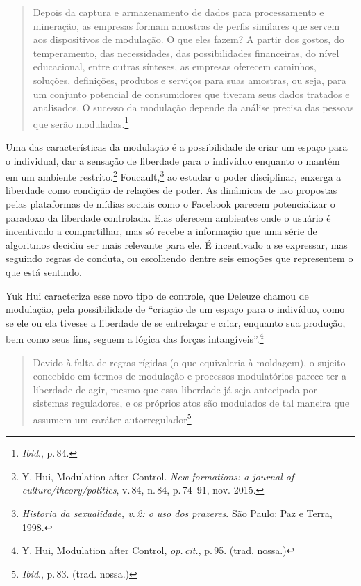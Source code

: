 \begin{quote}
Depois da captura e armazenamento de dados para processamento e
mineração, as empresas formam amostras de perfis similares que servem
aos dispositivos de modulação. O que eles fazem? A partir dos gostos, do
temperamento, das necessidades, das possibilidades financeiras, do nível
educacional, entre outras sínteses, as empresas oferecem caminhos,
soluções, definições, produtos e serviços para suas amostras, ou seja,
para um conjunto potencial de consumidores que tiveram seus dados
tratados e analisados. O sucesso da modulação depende da análise precisa
das pessoas que serão moduladas.\footnote{\textit{Ibid}., p.\,84.}
\end{quote}

Uma das características da modulação é a possibilidade de criar um
espaço para o individual, dar a sensação de liberdade para o indivíduo
enquanto o mantém em um ambiente restrito.\footnote{Y. Hui, Modulation after Control. \textit{New formations: a journal of culture/theory/politics}, v.\,84, n.\,84, p.\,74--91, nov. 2015.} Foucault,\footnote{\textit{Historia da sexualidade, v.\,2: o uso dos prazeres}. São Paulo: Paz e Terra, 1998.} ao estudar o poder disciplinar, enxerga a liberdade como condição de
relações de poder. As dinâmicas de uso propostas pelas plataformas de
mídias sociais como o Facebook parecem potencializar o paradoxo da
liberdade controlada. Elas oferecem ambientes onde o usuário é
incentivado a compartilhar, mas só recebe a informação que uma série de
algoritmos decidiu ser mais relevante para ele. É incentivado a se
expressar, mas seguindo regras de conduta, ou escolhendo dentre seis
emoções que representem o que está sentindo.

Yuk Hui caracteriza esse novo tipo de controle, que Deleuze
chamou de modulação, pela possibilidade de ``criação de um espaço
para o indivíduo, como se ele ou ela tivesse a liberdade de se
entrelaçar e criar, enquanto sua produção, bem como seus fins, seguem a
lógica das forças intangíveis''.\footnote{Y. Hui, Modulation after Control, \textit{op.\,cit.}, p.\,95. (trad. nossa.)}

\begin{quote}
Devido à falta de regras rígidas (o que equivaleria à moldagem), o
sujeito concebido em termos de modulação e processos modulatórios parece
ter a liberdade de agir, mesmo que essa liberdade já seja antecipada por
sistemas reguladores, e os próprios atos são modulados de tal maneira
que assumem um caráter autorregulador\footnote{\textit{Ibid}., p.\,83. (trad. nossa.)}
\end{quote}

